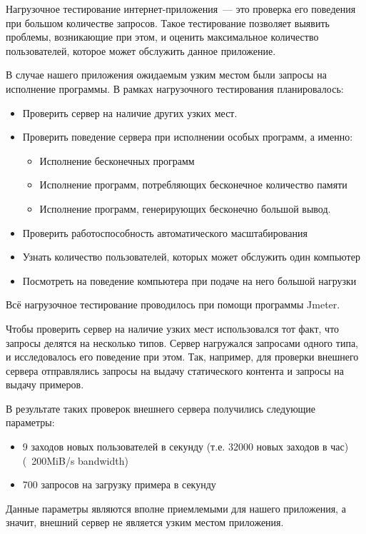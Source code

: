 	Нагрузочное тестирование интернет-приложения~--- это проверка его поведения при большом количестве запросов. Такое тестирование позволяет выявить проблемы, возникающие при этом, и оценить максимальное количество пользователей, которое может обслужить данное приложение.
	
	В случае нашего приложения ожидаемым узким местом были запросы на исполнение программы. В рамках нагрузочного тестирования планировалось: 
\begin{itemize}
\item Проверить сервер на наличие других узких мест.
\item Проверить поведение сервера при исполнении особых программ, а именно:
	\begin{itemize}
		\item Исполнение бесконечных программ
		\item Исполнение программ, потребляющих бесконечное количество памяти
		\item Исполнение программ, генерирующих бесконечно большой вывод.
	\end{itemize}
\item Проверить работоспособность автоматического масштабирования
\item Узнать количество пользователей, которых может обслужить один компьютер
\item Посмотреть на поведение компьютера при подаче на него большой нагрузки
\end{itemize}

	Всё нагрузочное тестирование проводилось при помощи программы Jmeter.

	Чтобы проверить сервер на наличие узких мест использовался тот факт, что запросы делятся на несколько типов. Сервер нагружался запросами одного типа, и исследовалось его поведение при этом. Так, например, для проверки внешнего сервера отправлялись запросы на выдачу статического контента и запросы на выдачу примеров.
	
	В результате таких проверок внешнего сервера получились следующие параметры:
\begin{itemize}
	\item 9 заходов новых пользователей в секунду (т.е. 32000 новых заходов в час) (~200MiB/s bandwidth)
	\item 700 запросов на загрузку примера в секунду
\end{itemize}
	Данные параметры являются вполне приемлемыми для нашего приложения, а значит, внешний сервер не является узким местом приложения. 
	
